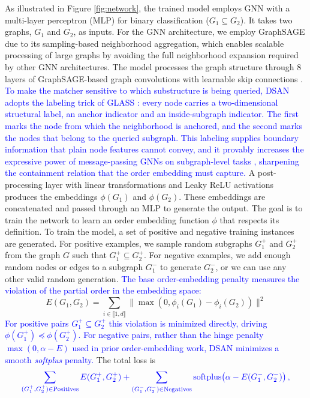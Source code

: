 \documentclass[preprint,12pt]{elsarticle}
\newcommand{\new}[1]{\textcolor{blue}{#1}}
\theoremstyle{plain}
\theoremstyle{definition}
\theoremstyle{remark}
\begin{document}
As illustrated in Figure \ref{fig:network}, the trained model employs GNN with a multi-layer perceptron (MLP) for binary classification (\( G_1 \subseteq G_2 \)). It takes two graphs, \( G_1 \) and \( G_2 \), as inputs. For the GNN architecture, we employ GraphSAGE \cite{hamilton2018inductive} due to its sampling-based neighborhood aggregation, which enables scalable processing of large graphs by avoiding the full neighborhood expansion required by other GNN architectures. The model processes the graph structure through 8 layers of GraphSAGE-based graph convolutions with learnable skip connections \cite{hamilton2018inductive}. \new{To make the matcher sensitive to which substructure is being queried, DSAN adopts the labeling trick of GLASS \cite{wang2022glass}: every node carries a two-dimensional structural label, an anchor indicator and an inside-subgraph indicator. The first marks the node from which the neighborhood is anchored, and the second marks the nodes that belong to the queried subgraph. This labeling supplies boundary information that plain node features cannot convey, and it provably increases the expressive power of message-passing GNNs on subgraph-level tasks \cite{wang2022glass}, sharpening the containment relation that the order embedding must capture.} A post-processing layer with linear transformations and Leaky ReLU activations produces the embeddings \( \phi(G_1) \) and \( \phi(G_2) \). These embeddings are concatenated and passed through an MLP to generate the output. The goal is to train the network to learn an order embedding function \( \phi \) that respects its definition. To train the model, a set of positive and negative training instances are generated. For positive examples, we sample random subgraphs \( G^+_1 \) and \( G^+_2 \) from the graph \( G \) such that \( G^+_1 \subseteq G^+_2 \). For negative examples, we add enough random nodes or edges to a subgraph \( G^-_1 \) to generate \( G^-_2 \), or we can use any other valid random generation. \new{The base order-embedding penalty \cite{vendrov2016orderembeddings} measures the violation of the partial order in the embedding space:}
\[
E(G_1, G_2) = \sum_{i \in \llbracket 1, d \rrbracket} \|\max(0, \phi_i(G_1) - \phi_i(G_2))\|^2
\]
\new{For positive pairs $G^+_1 \subseteq G^+_2$ this violation is minimized directly, driving $\phi(G^+_1) \preceq \phi(G^+_2)$. For negative pairs, rather than the hinge penalty $\max(0, \alpha - E)$ used in prior order-embedding work, DSAN minimizes a smooth \emph{softplus} penalty.} The total loss is
\begin{equation}
\label{eq:loss_function}
{\color{blue}\sum_{(G^+_1, G^+_2) \in \text{Positives}} E(G^+_1, G^+_2) + \sum_{(G^-_1, G^-_2) \in \text{Negatives}} \operatorname{softplus}\!\left(\alpha - E(G^-_1, G^-_2)\right),}
\end{equation}
\end{document}
